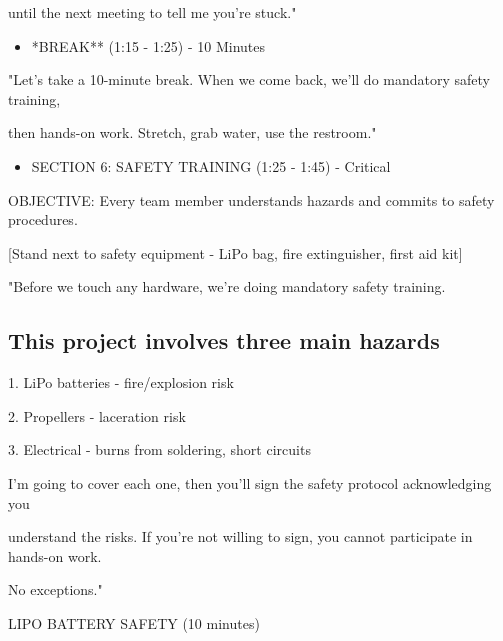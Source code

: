 \documentclass[11pt,letterpaper]{article}
\begin{document}
{until the next meeting to tell me you're stuck."\par

\begin{itemize}
  \item *BREAK** (1:15 - 1:25) - 10 Minutes
\end{itemize}

"Let's take a 10-minute break. When we come back, we'll do mandatory safety training,\par

then hands-on work. Stretch, grab water, use the restroom."\par

\begin{itemize}
  \item SECTION 6: SAFETY TRAINING (1:25 - 1:45) - Critical
\end{itemize}

OBJECTIVE: Every team member understands hazards and commits to safety procedures.\par

[Stand next to safety equipment - LiPo bag, fire extinguisher, first aid kit]\par

"Before we touch any hardware, we're doing mandatory safety training.\par

\subsection{This project involves three main hazards}

1. LiPo batteries - fire/explosion risk\par

2. Propellers - laceration risk\par

3. Electrical - burns from soldering, short circuits\par

I'm going to cover each one, then you'll sign the safety protocol acknowledging you\par

understand the risks. If you're not willing to sign, you cannot participate in hands-on work.\par

No exceptions."\par

LIPO BATTERY SAFETY (10 minutes)\par

}
\end{document}
